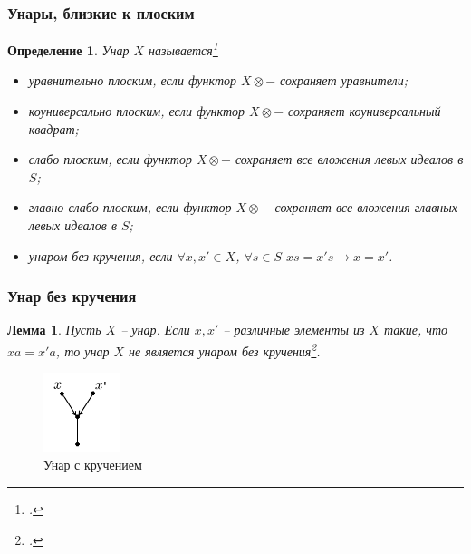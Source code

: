 \documentclass[11pt, notheorems]{beamer}
\newtheorem{definition}{Определение}
\newtheorem{lemma}{Лемма}
\begin{document}
\begin{frame}
	\frametitle{Унары, близкие к плоским}

	\begin{definition}
		Унар $X$ называется\footcite[определения III.9.1 и III.8.1]{kilp}

		\begin{itemize}
			\item уравнительно плоским, если функтор $X \otimes - $ сохраняет уравнители;
			\item коуниверсально плоским, если функтор $X \otimes - $ сохраняет коуниверсальный квадрат;
			\item слабо плоским, если функтор $X \otimes - $ сохраняет все вложения левых идеалов в $S$;
			\item главно слабо плоским, если функтор $X \otimes - $ сохраняет все вложения главных левых идеалов в $S$;
			\item унаром без кручения, если $\forall x, x' \in X$, $\forall s \in S$ $xs = x's \rightarrow x = x'$.

		\end{itemize}
	\end{definition}
\end{frame}

\begin{frame}
	\frametitle{Унар без кручения}

	\begin{lemma}
		Пусть $X$ -- унар. Если $x, x'$ -- различные элементы из $X$ такие, что $x a = x' a$, то унар $X$ не является унаром без кручения\footcite[лемма 3]{pryan:unars_close_to_flat}.
	\end{lemma}

	\begin{figure}
		\center
		\includegraphics[width=0.2\textwidth]{torsion_free.png}
		\caption{Унар с кручением}
	\end{figure}
\end{frame}
\end{document}
